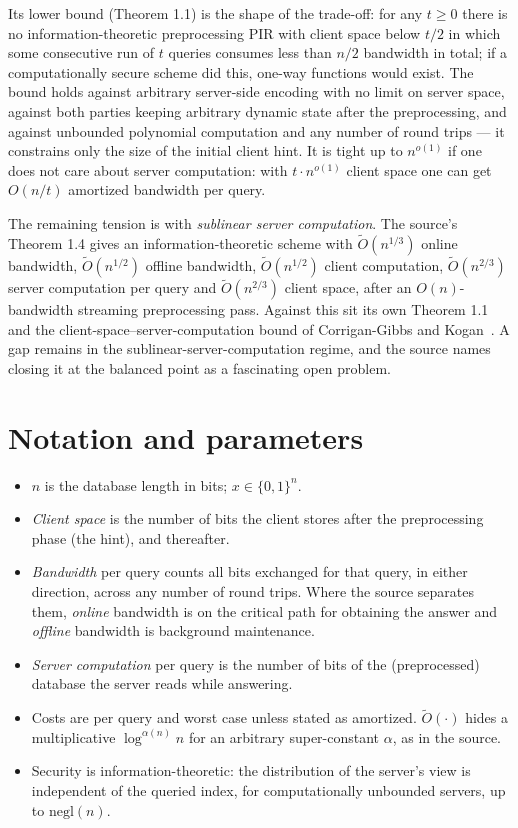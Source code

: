 \documentclass{aicr-conjecture}
\newcommand{\Ot}{\widetilde{O}}
\begin{document}
Its lower bound (Theorem 1.1) is the shape of the trade-off: for any $t
\ge 0$ there is no information-theoretic preprocessing PIR with client
space below $t/2$ in which some consecutive run of $t$ queries consumes
less than $n/2$ bandwidth in total; if a computationally secure scheme
did this, one-way functions would exist. The bound holds against
arbitrary server-side encoding with no limit on server space, against
both parties keeping arbitrary dynamic state after the preprocessing,
and against unbounded polynomial computation and any number of round
trips --- it constrains only the size of the initial client hint. It is
tight up to $n^{o(1)}$ if one does not care about server computation:
with $t \cdot n^{o(1)}$ client space one can get $O(n/t)$ amortized
bandwidth per query.

The remaining tension is with \emph{sublinear server computation}. The
source's Theorem 1.4 gives an information-theoretic scheme with
$\Ot(n^{1/3})$ online bandwidth, $\Ot(n^{1/2})$ offline bandwidth,
$\Ot(n^{1/2})$ client computation, $\Ot(n^{2/3})$ server computation per
query and $\Ot(n^{2/3})$ client space, after an $O(n)$-bandwidth
streaming preprocessing pass. Against this sit its own Theorem 1.1 and
the client-space--server-computation bound of Corrigan-Gibbs and
Kogan~\cite{CK20}. A gap remains in the sublinear-server-computation
regime, and the source names closing it at the balanced point as a
fascinating open problem.

\section{Notation and parameters}\label{sec:notation}

\begin{itemize}[nosep]
  \item $n$ is the database length in bits; $x \in \{0,1\}^{n}$.
  \item \emph{Client space} is the number of bits the client stores after
    the preprocessing phase (the hint), and thereafter.
  \item \emph{Bandwidth} per query counts all bits exchanged for that
    query, in either direction, across any number of round trips. Where
    the source separates them, \emph{online} bandwidth is on the
    critical path for obtaining the answer and \emph{offline} bandwidth
    is background maintenance.
  \item \emph{Server computation} per query is the number of bits of the
    (preprocessed) database the server reads while answering.
  \item Costs are per query and worst case unless stated as amortized.
    $\Ot(\cdot)$ hides a multiplicative $\log^{\alpha(n)} n$ for an
    arbitrary super-constant $\alpha$, as in the source.
  \item Security is information-theoretic: the distribution of the
    server's view is independent of the queried index, for
    computationally unbounded servers, up to $\mathrm{negl}(n)$.
\end{itemize}
\end{document}
